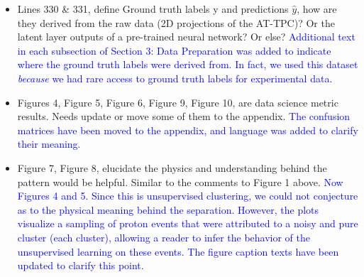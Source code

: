 \documentclass[12pt]{article}
\begin{document}
\begin{itemize}
\item Lines 330 \& 331, define Ground truth labels y and predictions $\hat{y}$, how are they derived from
the raw data (2D projections of the AT-TPC)? Or the latent layer outputs of a pre-trained neural
network? Or else?
\textcolor{blue}{Additional text in each subsection of Section 3: Data Preparation was added to indicate where the ground truth labels were derived from. In fact, we used this dataset {\it because} we had rare access to ground truth labels for experimental data.}
\item Figures 4, Figure 5, Figure 6, Figure 9, Figure 10, are data science metric results. Needs update or
move some of them to the appendix.
\textcolor{blue}{The confusion matrices have been moved to the appendix, and language was added to clarify their meaning.}
\item Figure 7, Figure 8, elucidate the physics and understanding behind the pattern would be helpful.
Similar to the comments to Figure 1 above.
\textcolor{blue}{Now Figures 4 and 5. Since this is unsupervised clustering, we could not conjecture as to the physical meaning behind the separation. However, the plots visualize a sampling of proton events that were attributed to a noisy and pure cluster (each cluster), allowing a reader to infer the behavior of the unsupervised learning on these events. The figure caption texts have been updated to clarify this point. }
\end{itemize}
\end{document}
